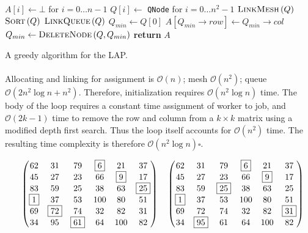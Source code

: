 \documentclass{article}
\newcommand{\boundedBy}[1]{\mathcal{O} \left ( #1 \right )}
\newcommand{\FuncCall}[2]{\textsc{#1} \left ( #2 \right )}
\begin{document}
\begin{algorithm}
\begin{algorithmic}
 
\State $A[i] \gets \bot$ for $i = 0 \ldots n - 1$ 
\State $Q[i] \gets$ \texttt{QNode} for $i = 0 \ldots n^2 - 1$
\State $\FuncCall{LinkMesh}{Q}$ 
\State $\FuncCall{Sort}{Q}$ 
\State $\FuncCall{LinkQueue}{Q}$ 
\State $Q_{min} \gets Q[0]$
	\State $A[ Q_{min} \rightarrow row ] \gets Q_{min} \rightarrow col$
	\State $Q_{min} \gets \FuncCall{DeleteNode}{Q, Q_{min}}$ 
\EndWhile
\State \textbf{return} $A$
\EndProcedure
\end{algorithmic}
\caption{A greedy algorithm for the LAP.}
\label{alg:greedy}
\end{algorithm}

\paragraph{} Allocating and linking for assignment is $\boundedBy{n}$; mesh $\boundedBy{n^2}$; queue $\boundedBy{2n^2\log n + n^2}$. Therefore, initialization requires $\boundedBy{n^2 \log n}$ time. The body of the loop requires a constant time assignment of worker to job, and $\boundedBy{2k - 1}$ time to remove the row and column from a $k \times k$ matrix using a modified depth first search. Thus the loop itself accounts for $\boundedBy{n^2}$ time. The resulting time complexity is therefore $\boundedBy{n^2 \log n} \square$.

\begin{equation*}
\quad
\begin{pmatrix}
62 & 31 & 79 & \fbox{6} & 21 & 37 \\
45 & 27 & 23 & 66 & \fbox{9} & 17 \\
83 & 59 & 25 & 38 & 63 & \fbox{25} \\
\fbox{1} & 37 & 53 & 100 & 80 & 51 \\
69 & \fbox{72} & 74 & 32 & 82 & 31 \\
34 & 95 & \fbox{61} & 64 & 100 & 82 \\
\end{pmatrix}
\quad
\begin{pmatrix}
62 & 31 & 79 & \fbox{6} & 21 & 37 \\
45 & 27 & 23 & 66 & \fbox{9} & 17 \\
83 & 59 & \fbox{25} & 38 & 63 & 25 \\
\fbox{1} & 37 & 53 & 100 & 80 & 51 \\
69 & 72 & 74 & 32 & 82 & \fbox{31} \\
34 & \fbox{95} & 61 & 64 & 100 & 82 \\
\end{pmatrix}
\end{equation*}
\end{document}
